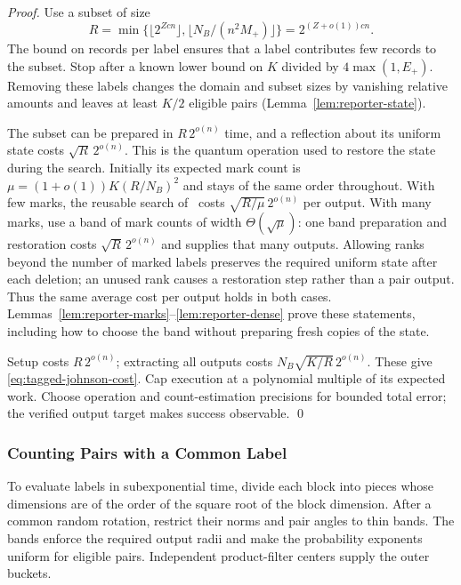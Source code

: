 \documentclass[runningheads,envcountsame,envcountsect,orivec]{llncs}
\begin{document}
\begin{proof}
Use a subset of size
\[
 R=\min\{\lfloor2^{Zcn}\rfloor,
          \lfloor N_B/(n^2M_+)\rfloor\}=2^{(Z+o(1))cn}.
\]
The bound on records per label ensures that a label contributes
few records to the subset. Stop after a known lower bound on $K$
divided by $4\max(1,E_+)$. Removing these labels changes the
domain and subset sizes by vanishing relative amounts and
leaves at least $K/2$ eligible pairs
(Lemma~\ref{lem:reporter-state}).

The subset can be prepared in $R\,2^{o(n)}$ time, and a
reflection about its uniform state costs
$\sqrt R\,2^{o(n)}$. This is the quantum operation used to
restore the state during the search. Initially its expected mark count is
$\mu=(1+o(1))K(R/N_B)^2$ and stays of the same order
throughout. With few marks, the reusable search
of~\cite{BCSS23,BLSS25} costs
$\sqrt{R/\mu}\,2^{o(n)}$ per output. With many marks, use a
band of mark counts of width $\Theta(\sqrt\mu)$: one band
preparation and restoration costs $\sqrt R\,2^{o(n)}$ and
supplies that many outputs. Allowing ranks beyond the number
of marked labels preserves the required uniform state after
each deletion; an unused rank causes a restoration step rather
than a pair output. Thus the same average cost per output
holds in both cases. Lemmas~\ref{lem:reporter-marks}--\ref{lem:reporter-dense}
prove these statements, including how to choose the band
without preparing fresh copies of the state.

Setup costs $R\,2^{o(n)}$; extracting all outputs costs
$N_B\sqrt{K/R}\,2^{o(n)}$. These give
\eqref{eq:tagged-johnson-cost}. Cap execution at a polynomial
multiple of its expected work. Choose operation and count-estimation
precisions for bounded total error; the verified output target
makes success observable.
\qed
\end{proof}

\subsubsection{Counting Pairs with a Common Label}




To evaluate labels in subexponential time, divide each block
into pieces whose dimensions are of the order of the square
root of the block dimension. After a common random rotation,
restrict their norms and pair angles to thin bands. The
bands enforce the required output radii and make the
probability exponents uniform for eligible pairs.
Independent product-filter centers supply the outer buckets.
\end{document}
